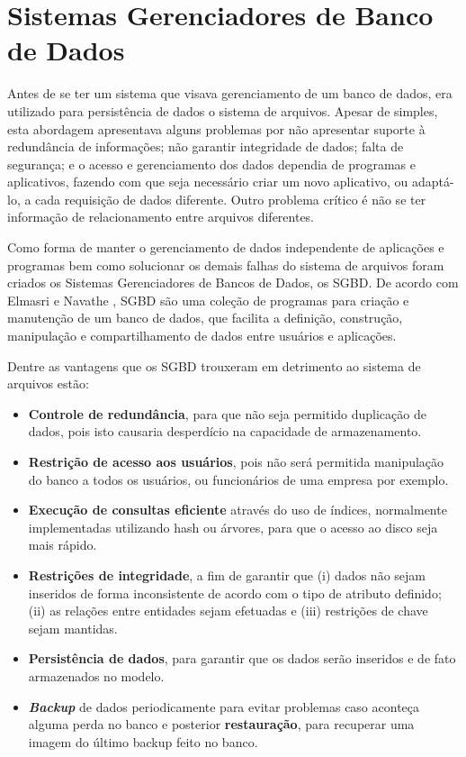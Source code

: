 \graphicspath{ {3-SGBD/} }

\chapter{Sistemas Gerenciadores de Banco de Dados}
\label{sgbd}

Antes de se ter um sistema que visava gerenciamento de um banco de dados, era utilizado para persistência de dados o sistema de arquivos. 
Apesar de simples, esta abordagem apresentava alguns problemas por não apresentar suporte à redundância de informações; não garantir integridade de dados; 
falta de segurança; e o acesso e gerenciamento dos dados dependia de programas e aplicativos, fazendo com que seja necessário criar um novo aplicativo, ou adaptá-lo, a 
cada requisição de dados diferente. Outro problema crítico é não se ter informação de relacionamento entre arquivos diferentes.

Como forma de manter o gerenciamento de dados independente de aplicações e programas bem como solucionar os demais falhas do sistema de arquivos 
foram criados os Sistemas Gerenciadores de Bancos de Dados, os SGBD. De acordo com Elmasri e Navathe \cite{navathe2011banco}, SGBD são uma coleção de programas para 
criação e manutenção de um banco de dados, que facilita a definição, construção, manipulação e compartilhamento de dados entre usuários e aplicações.

Dentre as vantagens que os SGBD trouxeram em detrimento ao sistema de arquivos estão:

\begin{itemize}
    \item{\textbf{Controle de redundância}}, para que não seja permitido duplicação de dados, pois isto causaria desperdício na capacidade de armazenamento.
    \item{\textbf{Restrição de acesso aos usuários}}, pois não será permitida manipulação do banco a todos os usuários, ou funcionários de uma empresa por exemplo.
    \item{\textbf{Execução de consultas eficiente}} através do uso de índices, normalmente implementadas utilizando hash ou árvores, para que o acesso ao disco seja mais rápido.
    \item{\textbf{Restrições de integridade}}, a fim de garantir que (i) dados não sejam inseridos de forma inconsistente de acordo com o tipo de atributo definido; 
    (ii) as relações entre entidades sejam efetuadas e (iii) restrições de chave sejam mantidas.
    \item{\textbf{Persistência de dados}}, para garantir que os dados serão inseridos e de fato armazenados no modelo.
    \item{\textbf{\textit{Backup}}} de dados periodicamente para evitar problemas caso aconteça alguma perda no banco e posterior \textbf{restauração}, para recuperar uma imagem do último backup feito no banco.
\end{itemize}

